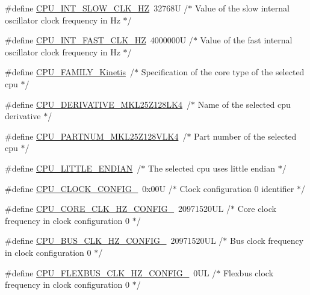 \begin{DoxyCompactItemize}
\item 
\#define \hyperlink{group___cpu__module_ga925e4835a9fdb52f03bd354d62d6ba0a}{C\+P\+U\+\_\+\+I\+N\+T\+\_\+\+S\+L\+O\+W\+\_\+\+C\+L\+K\+\_\+\+HZ}~32768\+U /$\ast$ Value of the slow internal oscillator clock frequency in Hz  $\ast$/
\item 
\#define \hyperlink{group___cpu__module_ga741ad9275688de8051f4bebd98a682bc}{C\+P\+U\+\_\+\+I\+N\+T\+\_\+\+F\+A\+S\+T\+\_\+\+C\+L\+K\+\_\+\+HZ}~4000000\+U /$\ast$ Value of the fast internal oscillator clock frequency in Hz  $\ast$/
\item 
\#define \hyperlink{group___cpu__module_ga5bf3022570d9bb7a0d666f2dd9db6a34}{C\+P\+U\+\_\+\+F\+A\+M\+I\+L\+Y\+\_\+\+Kinetis}~/$\ast$ Specification of the core type of the selected cpu $\ast$/
\item 
\#define \hyperlink{group___cpu__module_ga2a3e9dd6039080eb14febb4170e28908}{C\+P\+U\+\_\+\+D\+E\+R\+I\+V\+A\+T\+I\+V\+E\+\_\+\+M\+K\+L25\+Z128\+L\+K4}~/$\ast$ Name of the selected cpu derivative $\ast$/
\item 
\#define \hyperlink{group___cpu__module_gac7935d3a36bc77e04bc16409e9ecdec3}{C\+P\+U\+\_\+\+P\+A\+R\+T\+N\+U\+M\+\_\+\+M\+K\+L25\+Z128\+V\+L\+K4}~/$\ast$ Part number of the selected cpu $\ast$/
\item 
\#define \hyperlink{group___cpu__module_gab62ca27d0a6a531f35842a6e3a94b454}{C\+P\+U\+\_\+\+L\+I\+T\+T\+L\+E\+\_\+\+E\+N\+D\+I\+AN}~/$\ast$ The selected cpu uses little endian $\ast$/
\item 
\#define \hyperlink{group___cpu__module_ga4d7ade6a1c335a7e5233938aa9197157}{C\+P\+U\+\_\+\+C\+L\+O\+C\+K\+\_\+\+C\+O\+N\+F\+I\+G\+\_}~0x00\+U /$\ast$ Clock configuration 0 identifier $\ast$/
\item 
\#define \hyperlink{group___cpu__module_ga6fe0b841d40421ee48af4a4e01e48ddf}{C\+P\+U\+\_\+\+C\+O\+R\+E\+\_\+\+C\+L\+K\+\_\+\+H\+Z\+\_\+\+C\+O\+N\+F\+I\+G\+\_}~20971520\+U\+L /$\ast$ Core clock frequency in clock configuration 0 $\ast$/
\item 
\#define \hyperlink{group___cpu__module_gaf060a047649b9537eb77354ab7917a8b}{C\+P\+U\+\_\+\+B\+U\+S\+\_\+\+C\+L\+K\+\_\+\+H\+Z\+\_\+\+C\+O\+N\+F\+I\+G\+\_}~20971520\+U\+L /$\ast$ Bus clock frequency in clock configuration 0 $\ast$/
\item 
\#define \hyperlink{group___cpu__module_ga706c0d4dd14c93181b7a99badddc9a51}{C\+P\+U\+\_\+\+F\+L\+E\+X\+B\+U\+S\+\_\+\+C\+L\+K\+\_\+\+H\+Z\+\_\+\+C\+O\+N\+F\+I\+G\+\_}~0\+U\+L /$\ast$ Flexbus clock frequency in clock configuration 0 $\ast$/

\end{DoxyCompactItemize}
